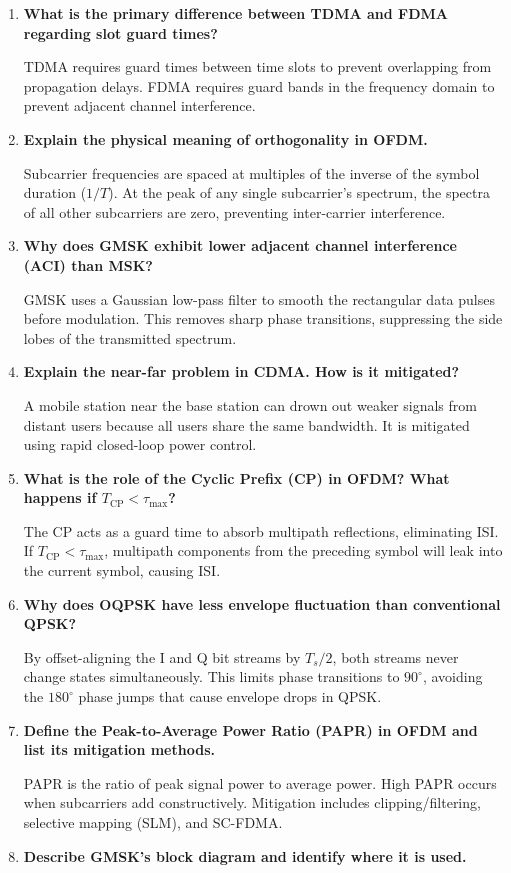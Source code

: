 \documentclass[12pt,a4paper]{article}
\newcommand{\Q}[1]{\textbf{#1}\par\noindent\ignorespaces}
\begin{document}
\begin{tcolorbox}[exambox, title={\textbf{Frequently Asked / Viva Questions}}]
\begin{enumerate}[topsep=0pt, label=\textbf{Q\arabic*.}, itemsep=5pt]
  \item \Q{What is the primary difference between TDMA and FDMA regarding slot guard times?}
    TDMA requires guard times between time slots to prevent overlapping from propagation delays. FDMA requires guard bands in the frequency domain to prevent adjacent channel interference.
  \item \Q{Explain the physical meaning of orthogonality in OFDM.}
    Subcarrier frequencies are spaced at multiples of the inverse of the symbol duration ($1/T$). At the peak of any single subcarrier's spectrum, the spectra of all other subcarriers are zero, preventing inter-carrier interference.
  \item \Q{Why does GMSK exhibit lower adjacent channel interference (ACI) than MSK?}
    GMSK uses a Gaussian low-pass filter to smooth the rectangular data pulses before modulation. This removes sharp phase transitions, suppressing the side lobes of the transmitted spectrum.
  \item \Q{Explain the near-far problem in CDMA. How is it mitigated?}
    A mobile station near the base station can drown out weaker signals from distant users because all users share the same bandwidth. It is mitigated using rapid closed-loop power control.
  \item \Q{What is the role of the Cyclic Prefix (CP) in OFDM? What happens if $T_{\text{CP}} < \tau_{\text{max}}$?}
    The CP acts as a guard time to absorb multipath reflections, eliminating ISI. If $T_{\text{CP}} < \tau_{\text{max}}$, multipath components from the preceding symbol will leak into the current symbol, causing ISI.
  \item \Q{Why does OQPSK have less envelope fluctuation than conventional QPSK?}
    By offset-aligning the I and Q bit streams by $T_s/2$, both streams never change states simultaneously. This limits phase transitions to $90^\circ$, avoiding the $180^\circ$ phase jumps that cause envelope drops in QPSK.
  \item \Q{Define the Peak-to-Average Power Ratio (PAPR) in OFDM and list its mitigation methods.}
    PAPR is the ratio of peak signal power to average power. High PAPR occurs when subcarriers add constructively. Mitigation includes clipping/filtering, selective mapping (SLM), and SC-FDMA.
  \item \Q{Describe GMSK's block diagram and identify where it is used.}

\end{enumerate}
\end{tcolorbox}
\end{document}
